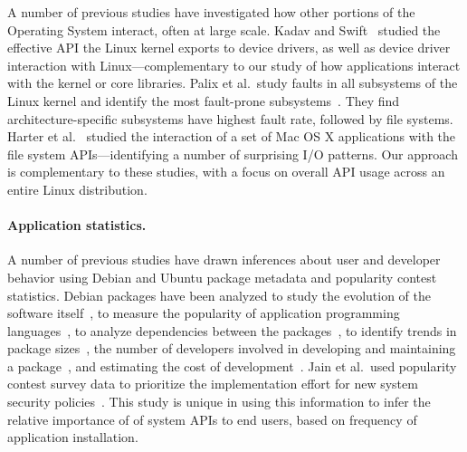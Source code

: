 A number of previous studies have investigated how other portions of the Operating System
interact, often at large scale.
Kadav and Swift~\citep{understand-drivers} studied the effective API the Linux kernel exports 
to device drivers, as well as device driver interaction with Linux---complementary to our study
of how applications interact with the kernel or core libraries.
Palix et al.\ study faults in all subsystems of the Linux kernel and identify the 
most fault-prone subsystems~\citep{linux-faults}.
They find architecture-specific subsystems have highest fault rate, followed by file systems.
Harter et al.~\citep{file-not-file} studied
 the interaction of a set of Mac OS X applications with the file system APIs---identifying a number
of surprising I/O patterns.
Our approach is complementary to these studies, with a focus on overall API 
usage across an entire Linux distribution.



\paragraph{Application statistics.}
A number of previous studies have drawn inferences about user and developer behavior
using Debian and Ubuntu package metadata and popularity contest statistics.
Debian packages have been analyzed to study the evolution 
of the software itself~\citep{macro-study, life-death, mining-over-time}, 
to measure the popularity of application programming 
languages~\citep{upgrade-libre}, to analyze dependencies between the packages~\citep{package-dependency}, 
to identify trends in package sizes~\citep{pigs-to-stripes}, 
the number of developers involved in developing and maintaining a package~\citep{toy-story},
and estimating the cost of development~\citep{measuring-woody}.
Jain et al.\ used popularity contest survey data to 
prioritize the implementation effort for new system security policies~\citep{jain14setuid}. %
This study is unique in using this information to infer the relative importance of 
of system APIs to end users, based on frequency of application installation.

